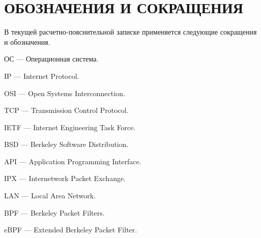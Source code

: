 \section*{\centering ОБОЗНАЧЕНИЯ И СОКРАЩЕНИЯ}

В текущей расчетно-пояснительной записке применяется следующие сокращения и обозначения.

\begin{description}[leftmargin=0pt]
	\item \noindent ОС --- Операционная система.
	\item \noindent IP ---  Internet Protocol. 
	\item \noindent OSI --- Open Systems Interconnection. 
	\item \noindent TCP --- Transmission Control Protocol.
	\item \noindent IETF --- Internet Engineering Task Force.
	\item \noindent BSD --- Berkeley Software Distribution.
	\item \noindent API --- Application Programming Interface.
	\item \noindent IPX --- Internetwork Packet Exchange.
	\item \noindent LAN --- Local Area Network.
	\item \noindent BPF --- Berkeley Packet Filters.
	\item \noindent eBPF --- Extended Berkeley Packet Filter.
\end{description}

